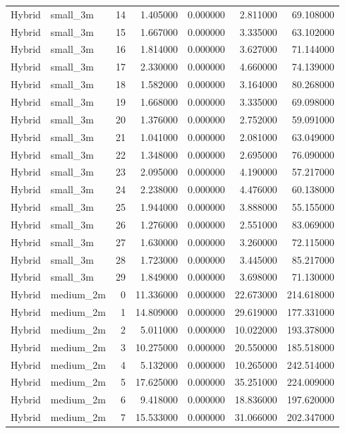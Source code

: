 \begin{tabular}{llrrrrr}
Hybrid & small_3m & 14 & 1.405000 & 0.000000 & 2.811000 & 69.108000 \\
Hybrid & small_3m & 15 & 1.667000 & 0.000000 & 3.335000 & 63.102000 \\
Hybrid & small_3m & 16 & 1.814000 & 0.000000 & 3.627000 & 71.144000 \\
Hybrid & small_3m & 17 & 2.330000 & 0.000000 & 4.660000 & 74.139000 \\
Hybrid & small_3m & 18 & 1.582000 & 0.000000 & 3.164000 & 80.268000 \\
Hybrid & small_3m & 19 & 1.668000 & 0.000000 & 3.335000 & 69.098000 \\
Hybrid & small_3m & 20 & 1.376000 & 0.000000 & 2.752000 & 59.091000 \\
Hybrid & small_3m & 21 & 1.041000 & 0.000000 & 2.081000 & 63.049000 \\
Hybrid & small_3m & 22 & 1.348000 & 0.000000 & 2.695000 & 76.090000 \\
Hybrid & small_3m & 23 & 2.095000 & 0.000000 & 4.190000 & 57.217000 \\
Hybrid & small_3m & 24 & 2.238000 & 0.000000 & 4.476000 & 60.138000 \\
Hybrid & small_3m & 25 & 1.944000 & 0.000000 & 3.888000 & 55.155000 \\
Hybrid & small_3m & 26 & 1.276000 & 0.000000 & 2.551000 & 83.069000 \\
Hybrid & small_3m & 27 & 1.630000 & 0.000000 & 3.260000 & 72.115000 \\
Hybrid & small_3m & 28 & 1.723000 & 0.000000 & 3.445000 & 85.217000 \\
Hybrid & small_3m & 29 & 1.849000 & 0.000000 & 3.698000 & 71.130000 \\
Hybrid & medium_2m & 0 & 11.336000 & 0.000000 & 22.673000 & 214.618000 \\
Hybrid & medium_2m & 1 & 14.809000 & 0.000000 & 29.619000 & 177.331000 \\
Hybrid & medium_2m & 2 & 5.011000 & 0.000000 & 10.022000 & 193.378000 \\
Hybrid & medium_2m & 3 & 10.275000 & 0.000000 & 20.550000 & 185.518000 \\
Hybrid & medium_2m & 4 & 5.132000 & 0.000000 & 10.265000 & 242.514000 \\
Hybrid & medium_2m & 5 & 17.625000 & 0.000000 & 35.251000 & 224.009000 \\
Hybrid & medium_2m & 6 & 9.418000 & 0.000000 & 18.836000 & 197.620000 \\
Hybrid & medium_2m & 7 & 15.533000 & 0.000000 & 31.066000 & 202.347000 \\

\end{tabular}

